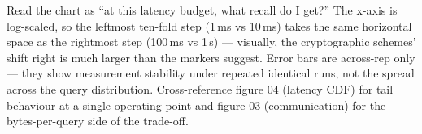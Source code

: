 Read the chart as ``at this latency budget, what recall do I get?''
The x-axis is log-scaled, so the leftmost ten-fold step (1\,ms vs
10\,ms) takes the same horizontal space as the rightmost step
(100\,ms vs 1\,s) --- visually, the cryptographic schemes' shift
right is much larger than the markers suggest. Error bars are
across-rep only --- they show measurement stability under repeated
identical runs, not the spread across the query distribution. Cross-reference figure 04 (latency CDF) for tail
behaviour at a single operating point and figure 03 (communication)
for the bytes-per-query side of the trade-off.
